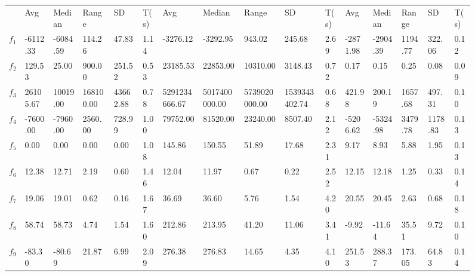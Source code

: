 \documentclass[paper=a4, fontsize=11pt]{scrartcl}
\numberwithin{equation}{section}
\numberwithin{figure}{section}
\numberwithin{table}{section}
\begin{document}
\begin{figure}
{{\begin{tabular}{c|lllll|lllll|lllll}
         & Avg      & Median    & Range     & SD        & T(s)      & Avg           & Median        & Range         & SD            & T(s)      & Avg       & Median        & Range         & SD            & T(s)     \\ \noalign{\smallskip}\hline\noalign{\smallskip}
$f_1$    & -6112.33 & -6084.59  & 114.26    & 47.83     & 1.14      & -3276.12      & -3292.95      & 943.02        & 245.68        & 2.69      & -2871.98  & -2904.39      & 1194.77       & 322.06        & 0.12     \\
$f_2$    & 129.53   & 25.00     & 900.00	& 251.52    & 0.53      & 23185.53      & 22853.00      & 10310.00      & 3148.43       & 0.72      & 0.17      & 0.15          & 0.25          & 0.08          & 0.09     \\
$f_3$    & 26105.67 & 10019.00  & 168100.00 & 43662.88  & 0.78      & 5291234666.67 & 5017400000.00 & 5739020000.00 & 1539343402.74 & 0.68      & 421.98    & 200.19        & 1657.68       & 497.31        & 0.10     \\
$f_4$    & -7600.00 & -7960.00  & 2560.00	& 728.99    & 1.00      & 79752.00      & 81520.00      & 23240.00      & 8507.40       & 2.12      & -5206.62  & -5324.98      & 3479.78       & 1178.83       & 0.13     \\
$f_5$    & 0.00     & 0.00      & 0.00	    & 0.00      & 1.08      & 145.86        & 150.55        & 51.89         & 17.68         & 2.31      & 9.17      & 8.93          & 5.88          & 1.95          & 0.13     \\
$f_6$    & 12.38    & 12.71     & 2.19	    & 0.60      & 1.46      & 12.04         & 11.97         & 0.67          & 0.22          & 2.52      & 12.15     & 12.18         & 1.25          & 0.33          & 0.14     \\
$f_7$    & 19.06    & 19.01     & 0.62	    & 0.16      & 1.67      & 36.69         & 36.60         & 5.76          & 1.54          & 4.20      & 20.55     & 20.45         & 2.63          & 0.68          & 0.18     \\
$f_8$    & 58.74    & 58.73     & 4.74	    & 1.54      & 1.60      & 212.86        & 213.95        & 41.20         & 11.06         & 3.41      & -9.92     & -11.64        & 35.51         & 9.72          & 0.10     \\
$f_9$    & -83.30   & -80.69    & 21.87	    & 6.99      & 2.09      & 276.38        & 276.83        & 14.65         & 4.35          & 4.10      & 251.53    & 288.37        & 173.05        & 64.83         & 0.14     \\

\end{tabular}}}
\end{figure}
\end{document}
